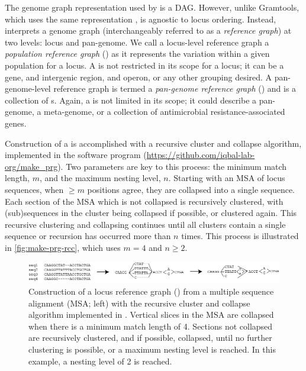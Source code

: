 The genome graph representation used by \pandora{} is a DAG. However, unlike Gramtools, which uses the same representation \cite{gramtools2021}, \pandora{} is agnostic to locus ordering. Instead, \pandora{} interprets a genome graph (interchangeably referred to as a \emph{reference graph}) at two levels: locus and pan-genome. We call a locus-level reference graph a \emph{population reference graph} (\prg{}) as it represents the variation within a given population for a locus. A \prg{} is not restricted in its scope for a locus; it can be a gene, and intergenic region, and operon, or any other grouping desired. A pan-genome-level reference graph is termed a \emph{pan-genome reference graph} (\panrg{}) and is a collection of \prg{}s. Again, a \panrg{} is not limited in its scope; it could describe a pan-genome, a meta-genome, or a collection of antimicrobial resistance-associated genes.

Construction of a \prg{} is accomplished with a recursive cluster and collapse algorithm, implemented in the software program \makeprg{} (\url{https://github.com/iqbal-lab-org/make_prg}). Two parameters are key to this process: the minimum match length, $m$, and the maximum nesting level, $n$. Starting with an MSA of locus sequences, when $\ge m$ positions agree, they are collapsed into a single sequence. Each section of the MSA which is not collapsed is recursively clustered, with (sub)sequences in the cluster being collapsed if possible, or clustered again. This recursive clustering and collapsing continues until all clusters contain a single sequence or recursion has occurred more than $n$ times. This process is illustrated in \autoref{fig:make-prg-rcc}, which uses $m=4$ and $n\ge 2$.

\begin{figure}
\centering
\includegraphics[width=1\columnwidth]{Chapter0/Figs/make-prg.png}
\caption{Construction of a locus reference graph (\prg{}) from a multiple sequence alignment (MSA; left) with the recursive cluster and collapse algorithm implemented in \makeprg{}. Vertical slices in the MSA are collapsed when there is a minimum match length of 4. Sections not collapsed are recursively clustered, and if possible, collapsed, until no further clustering is possible, or a maximum nesting level is reached. In this example, a nesting level of 2 is reached.}
\label{fig:make-prg-rcc}
\end{figure}

